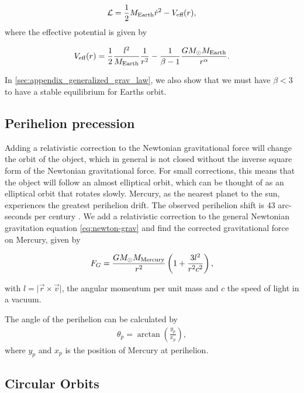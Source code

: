 \documentclass[../main.tex]{subfiles}
\begin{document}
\begin{align*}
    \mathcal{L}=\frac{1}{2}M_{\text{Earth}}\dot{r}^2-V_{\textnormal{eff}}(r),
\end{align*} where the effective potential is given by

\begin{align*}
    V_{\textnormal{eff}}(r)=\frac{1}{2}\frac{l^2}{M_{\text{Earth}}}\frac{1}{r^2}-\frac{1}{\beta-1}\frac{GM_{\odot}M_{\text{Earth}}}{r^{\alpha}}.
\end{align*} 

In \cref{sec:appendix_generalized_grav_law}, we also show that we must have \ensuremath{\beta<3} to have a stable equilibrium for Earths orbit. 

\subsection{Perihelion precession}

Adding a relativistic correction to the Newtonian gravitational force will change the orbit of the object, which in general is not closed without the inverse square form of the Newtonian gravitational force. For small corrections, this means that the object will follow an almost elliptical orbit, which can be thought of as an elliptical orbit that rotates slowly. Mercury, as the nearest planet to the sun, experiences the greatest perihelion drift. The observed perihelion shift is 43 arc-seconds per century \cite{Pollock2003}. We add a relativistic correction to the general Newtonian gravitation equation \cref{eq:newton-grav} and find the corrected gravitational force on Mercury, given by

\begin{align}
    F_G = \frac{G M_\odot M_{\textnormal{Mercury}}}{r^2} \left(1 + \frac{3l^2}{r^2 c^2} \right),
    \label{eq:rel-correction}
\end{align}

with $l = \vert \vec{r} \times \vec{v} \vert$, the angular momentum per unit mass and $c$ the speed of light in a vacuum.

The angle of the perihelion can be calculated by
\begin{align*}
    \theta_p=\arctan\left(\frac{y_p}{x_p}\right),
\end{align*} where $y_p$ and $x_p$ is the position of Mercury at perihelion. 

\subsection{Circular Orbits}
\end{document}
